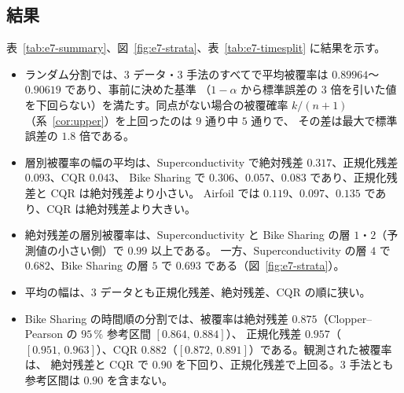 \documentclass[a4paper,11pt]{jsarticle}
\theoremstyle{definition}
\theoremstyle{plain}
\theoremstyle{remark}
\begin{document}
\subsection{結果}
\label{sec:real-data-results}
表~\ref{tab:e7-summary}、図~\ref{fig:e7-strata}、表~\ref{tab:e7-timesplit} に結果を示す。
\begin{itemize}
  \item ランダム分割では、$3$ データ・$3$ 手法のすべてで平均被覆率は $0.89964$〜$0.90619$ であり、事前に決めた基準
    （$1-\alpha$ から標準誤差の $3$ 倍を引いた値を下回らない）を満たす。同点がない場合の被覆確率 $k/(n+1)$（系~\ref{cor:upper}）を上回ったのは $9$ 通り中 $5$ 通りで、
    その差は最大で標準誤差の $1.8$ 倍である。
  \item 層別被覆率の幅の平均は、Superconductivity で絶対残差 $0.317$、正規化残差 $0.093$、CQR $0.043$、
    Bike Sharing で $0.306$、$0.057$、$0.083$ であり、正規化残差と CQR は絶対残差より小さい。
    Airfoil では $0.119$、$0.097$、$0.135$ であり、CQR は絶対残差より大きい。
  \item 絶対残差の層別被覆率は、Superconductivity と Bike Sharing の層 $1$・$2$（予測値の小さい側）で $0.99$ 以上である。
    一方、Superconductivity の層 $4$ で $0.682$、Bike Sharing の層 $5$ で $0.693$ である（図~\ref{fig:e7-strata}）。
  \item 平均の幅は、$3$ データとも正規化残差、絶対残差、CQR の順に狭い。
  \item Bike Sharing の時間順の分割では、被覆率は絶対残差 $0.875$（Clopper--Pearson の $95\,\%$ 参考区間 $[0.864,\,0.884]$）、
    正規化残差 $0.957$（$[0.951,\,0.963]$）、CQR $0.882$（$[0.872,\,0.891]$）である。観測された被覆率は、
    絶対残差と CQR で $0.90$ を下回り、正規化残差で上回る。$3$ 手法とも参考区間は $0.90$ を含まない。
\end{itemize}
\end{document}
